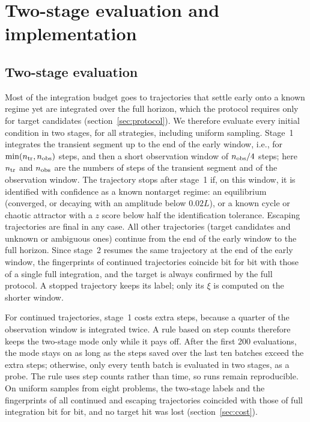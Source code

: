 \section{Two-stage evaluation and implementation}\label{app:implementation}

\subsection{Two-stage evaluation}\label{sec:twostage}

Most of the integration budget goes to trajectories that settle early onto a known regime yet are integrated over the full horizon, which the protocol requires only for target candidates (section~\ref{sec:protocol}). We therefore evaluate every initial condition in two stages, for all strategies, including uniform sampling. Stage~1 integrates the transient segment up to the end of the early window, i.e., for $\min(n_{\rm tr},n_{\rm obs})$ steps, and then a short observation window of $n_{\rm obs}/4$ steps; here $n_{\rm tr}$ and $n_{\rm obs}$ are the numbers of steps of the transient segment and of the observation window. The trajectory stops after stage~1 if, on this window, it is identified with confidence as a known nontarget regime: an equilibrium (converged, or decaying with an amplitude below $0.02L$), or a known cycle or chaotic attractor with a $z$ score below half the identification tolerance. Escaping trajectories are final in any case. All other trajectories (target candidates and unknown or ambiguous ones) continue from the end of the early window to the full horizon. Since stage~2 resumes the same trajectory at the end of the early window, the fingerprints of continued trajectories coincide bit for bit with those of a single full integration, and the target is always confirmed by the full protocol. A stopped trajectory keeps its label; only its $\xi$ is computed on the shorter window.

For continued trajectories, stage~1 costs extra steps, because a quarter of the observation window is integrated twice. A rule based on step counts therefore keeps the two-stage mode only while it pays off. After the first 200 evaluations, the mode stays on as long as the steps saved over the last ten batches exceed the extra steps; otherwise, only every tenth batch is evaluated in two stages, as a probe. The rule uses step counts rather than time, so runs remain reproducible. On uniform samples from eight problems, the two-stage labels and the fingerprints of all continued and escaping trajectories coincided with those of full integration bit for bit, and no target hit was lost (section~\ref{sec:cost}).

